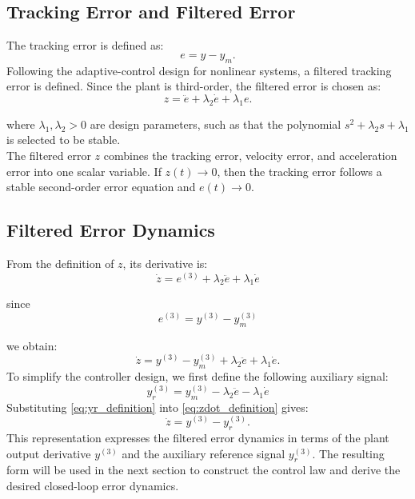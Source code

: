 \subsection{Tracking Error and Filtered Error}

The tracking error is defined as:
\begin{equation}
e = y-y_m.
\end{equation}
Following the adaptive-control design for nonlinear systems, a filtered tracking error is defined. Since the plant is third-order, the filtered error is chosen as:
\begin{equation}
z
=
\ddot{e}
+
\lambda_2\dot{e}
+
\lambda_1 e.
\label{eq:filtered_error}
\end{equation}

where \(\lambda_1,\lambda_2>0\) are design parameters, such as that the polynomial
$
s^2+\lambda_2s+\lambda_1
$
is selected to be stable.
\\

\noindent The filtered error \(z\) combines the tracking error, velocity error, and acceleration error into one scalar variable. If \(z(t)\rightarrow0\), then the tracking error follows a stable second-order error equation and \(e(t)\rightarrow0\).

\subsection{Filtered Error Dynamics}

From the definition of \(z\), its derivative is:
\begin{equation}
\dot{z}
=
e^{(3)}
+
\lambda_2\ddot{e}
+
\lambda_1\dot{e}
\end{equation}

since
\begin{equation}
e^{(3)}
=
y^{(3)}
-
y_m^{(3)}
\end{equation}

we obtain:
\begin{equation}
\dot{z}
=
y^{(3)}
-
y_m^{(3)}
+
\lambda_2\ddot{e}
+
\lambda_1\dot{e}.
\label{eq:zdot_definition}
\end{equation}
To simplify the controller design, we first define the following auxiliary signal:
\begin{equation}
y_r^{(3)}
=
y_m^{(3)}
-
\lambda_2\ddot{e}
-
\lambda_1\dot{e}
\label{eq:yr_definition}
\end{equation}
Substituting \eqref{eq:yr_definition} into \eqref{eq:zdot_definition} gives:
\begin{equation}
\dot{z}
=
y^{(3)}
-
y_r^{(3)}.
\label{eq:z_dot_compact}
\end{equation}
This representation expresses the filtered error dynamics in terms of the plant output derivative \(y^{(3)}\) and the auxiliary reference signal \(y_r^{(3)}\). The resulting form will be used in the next section to construct the control law and derive the desired closed-loop error dynamics.

